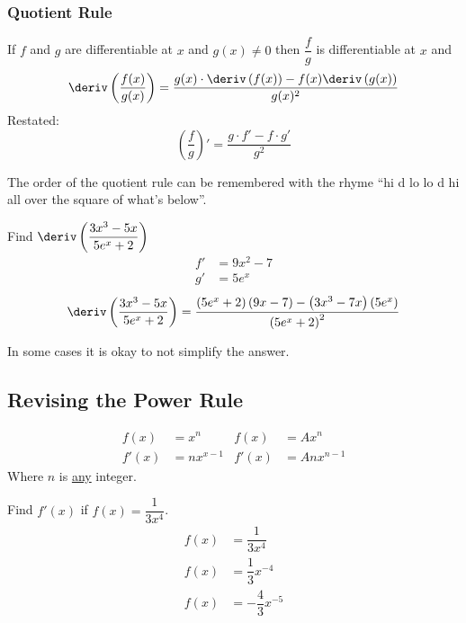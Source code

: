 \subsubsection{Quotient Rule}
\begin{theorem}
    If $f$ and $g$ are differentiable at $x$ and $g(x) \neq 0$ then $\dfrac{f}{g}$ is differentiable at $x$ and
    \begin{equation}
        \deriv\left(\dfrac{f(x)}{g(x)}\right) = \dfrac{g(x) \cdot \deriv\left(f(x)\right) - f(x) \deriv\left(g(x)\right)}{g(x)^2}
    \end{equation}
    Restated:
    \begin{equation}
        \left(\dfrac{f}{g}\right)' = \dfrac{g \cdot f' - f \cdot g'}{g^2}
    \end{equation}
\end{theorem}
\begin{remark}
    The order of the quotient rule can be remembered with the rhyme ``hi d lo lo d hi all over the square of what's below''.
\end{remark}
\begin{example}
    Find $\deriv\left(\dfrac{3x^3 - 5x}{5e^x + 2}\right)$
    \begin{align*}
        f' &= 9x^2-7 \\
        g' &= 5e^x
    \end{align*}
    \begin{equation*}
        \deriv\left(\dfrac{3x^3 - 5x}{5e^x+2}\right) = \dfrac{\left(5e^x + 2\right) \left(9x-7\right) - \left(3x^3 - 7x\right)\left(5e^x\right)}{\left(5e^x + 2\right)^2}
    \end{equation*}
\end{example}
\begin{remark}
    In some cases it is okay to not simplify the answer.
\end{remark}
\subsection{Revising the Power Rule}
\begin{align*}
    f(x)  &= x^n       & f(x)  &= Ax^n \\
    f'(x) &= nx^{x- 1} & f'(x) &= Anx^{n-1}
\end{align*}
Where $n$ is \underline{any} integer.
\begin{example}
    Find $f'(x)$ if $f(x) = \dfrac{1}{3x^4}$.
    \begin{align*}
        f(x) &= \dfrac{1}{3x^4} \\
        f(x) &= \dfrac{1}{3} x^{-4} \\
        f(x) &= -\dfrac{4}{3} x^{-5}
    \end{align*}
\end{example}
